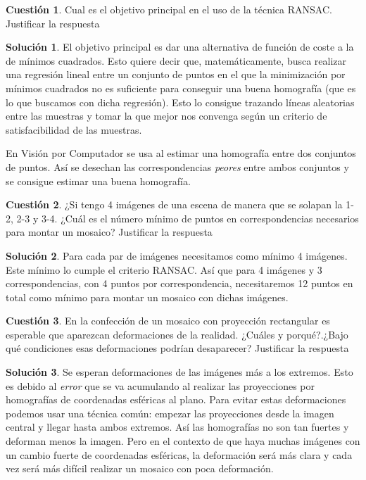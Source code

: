 \documentclass[a4paper, 11pt]{article}
\theoremstyle{definition}
\newtheorem{cuestion}{Cuestión}
\newtheorem*{solucion}{Solución}
\begin{document}
  \begin{cuestion}
    Cual es el objetivo principal en el uso de la técnica RANSAC. Justificar
    la respuesta
  \end{cuestion}

  \begin{solucion}
     	El objetivo principal es dar una alternativa de función de coste a la de mínimos
      cuadrados. Esto quiere decir que, matemáticamente, busca realizar una regresión
      lineal entre un conjunto de puntos en el que la minimización por mínimos cuadrados
      no es suficiente para conseguir una buena homografía (que es lo que buscamos con
      dicha regresión). Esto lo consigue trazando líneas aleatorias entre las muestras
      y tomar la que mejor nos convenga según un criterio de satisfacibilidad de las muestras.

      En Visión por Computador se usa al estimar una homografía entre dos conjuntos
      de puntos. Así se desechan las correspondencias \textit{peores} entre ambos conjuntos y se consigue
      estimar una buena homografía.
  \end{solucion}
  \begin{cuestion}
    ¿Si tengo 4 imágenes de una escena de manera que se solapan la 1-2, 2-3
    y 3-4. ¿Cuál es el número mínimo de puntos en correspondencias necesarios para
    montar un mosaico? Justificar la respuesta
  \end{cuestion}

  \begin{solucion}
     	Para cada par de imágenes necesitamos como mínimo 4 imágenes. Este mínimo lo
      cumple el criterio RANSAC. Así que para 4 imágenes y 3 correspondencias, con
      4 puntos por correspondencia, necesitaremos 12 puntos en total como mínimo
      para montar un mosaico con dichas imágenes.
  \end{solucion}

  \begin{cuestion}
    En la confección de un mosaico con proyección rectangular es esperable
   que aparezcan deformaciones de la realidad. ¿Cuáles y porqué?.¿Bajo qué
   condiciones esas deformaciones podrían desaparecer? Justificar la respuesta

  \end{cuestion}

  \begin{solucion}
    Se esperan deformaciones de las imágenes más a los extremos. Esto es debido al
    \textit{error} que se va acumulando al realizar las proyecciones por homografías
    de coordenadas esféricas al plano. Para evitar estas deformaciones podemos usar
    una técnica común: empezar las proyecciones desde la imagen central y llegar
    hasta ambos extremos. Así las homografías no son tan fuertes y deforman menos la imagen.
    Pero en el contexto de que haya muchas imágenes con un cambio fuerte de coordenadas
    esféricas, la deformación será más clara y cada vez será más difícil realizar
    un mosaico con poca deformación.
  \end{solucion}
\end{document}
